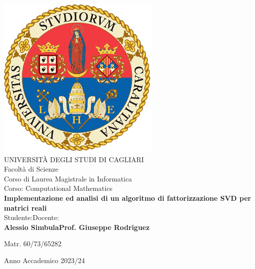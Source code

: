 \documentclass[a4paper,12pt]{report}
\begin{document}
\begin{titlepage}
\setlength{\topmargin}{-1.5cm}
\enlargethispage{28cm}
\begin{center}
  \includegraphics[scale=.5]{imgs/logo_uni_cagliari.png}\\[1cm]
  \LARGE UNIVERSIT\`A DEGLI STUDI DI CAGLIARI\\[.1cm]
  \Large Facolt\`a di Scienze\\[.1cm]
  \Large Corso di Laurea Magistrale in Informatica\\[.1cm]
  \Large Corso: Computational Mathematics\\[1.5cm]
  \Huge{\bf  Implementazione ed analisi di un
  			 algoritmo di fattorizzazione SVD per matrici reali
		}\\[5.5cm]
  \Large Studente:\hfill Docente:\\
  \Large {\bf Alessio Simbula\hfill Prof. Giuseppe Rodriguez}
  \begin{flushleft}
  \vspace{-0.5cm}
  \Large { Matr. 60/73/65282}\\[4.0cm]
  \end{flushleft}
  \Large Anno Accademico 2023/24
 \end{center}
\end{titlepage}


\tableofcontents
\clearpage





\end{document}
